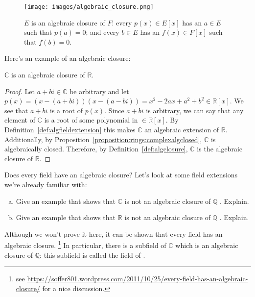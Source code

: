 \begin{figure}
\begin{center}
\texttt{[image: images/algebraic\_closure.png]}
\caption{$E$ is an algebraic closure of $F$:  every $p(x)\in E[x]$ has an $a\in E$ such that $p(a)=0$; and every $b\in E$ has an $f(x)\in F[x]$ such that $f(b)=0$.}\label{algebraicclosure}
\end{center}
\end{figure}

Here's an example of an algebraic closure:

\begin{prop}\label{proposition:rings:realalgclosure}
$\mathbb{C}$ is an algebraic closure of $\mathbb{R}$.
\end{prop}


\begin{proof}{}
Let $a+bi \in \mathbb{C}$ be arbitrary and let $p(x)=(x-(a+bi))(x-(a-bi))= x^2-2ax+a^2+b^2\in\mathbb{R}[x]$. We see that $a+bi$ is a root of $p(x)$. Since $a+bi$ is arbitrary, we can say that any element of $\mathbb{C}$ is a root of some polynomial in $\in\mathbb{R}[x]$. By Definition~\ref{def:algfieldextension} this makes $\mathbb{C}$ an algebraic extension of $\mathbb{R}$. Additionally, by Proposition~\ref{proposition:rings:complexalgclosed}, $\mathbb{C}$ is algebraically closed. Therefore, by Definition~\ref{def:algclosure}, $\mathbb{C}$ is the algebraic closure of $\mathbb{R}$.
\end{proof}

Does every field have an algebraic closure? Let's look at some field extensions we're already familiar with:

\begin{exercise}
\begin{enumerate}[(a)]
\item
Give an example that shows that $\mathbb{C}$ is not an algebraic closure of $\mathbb{Q}$ . Explain.
\item
Give an example that shows that $\mathbb{R}$ is not an algebraic closure of $\mathbb{Q}$ . Explain.
\end{enumerate}
\end{exercise}


Although we won't prove it here, it can be shown that every field has an algebraic closure.
\footnote{see  \url{https://soffer801.wordpress.com/2011/10/25/every-field-has-an-algebraic-closure/} for a nice discussion.} In particular, there is a subfield of $\mathbb{C}$ which is an algebraic closure of $\mathbb{Q}$: this subfield is called the field of .

